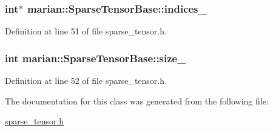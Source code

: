 \subsubsection[{\texorpdfstring{indices\+\_\+}{indices_}}]{\setlength{\rightskip}{0pt plus 5cm}int$\ast$ marian\+::\+Sparse\+Tensor\+Base\+::indices\+\_\+\hspace{0.3cm}{\ttfamily [private]}}\hypertarget{classmarian_1_1SparseTensorBase_a365dfd224d685b1cc9c8006d5f608cbf}{}\label{classmarian_1_1SparseTensorBase_a365dfd224d685b1cc9c8006d5f608cbf}


Definition at line 51 of file sparse\+\_\+tensor.\+h.

\subsubsection[{\texorpdfstring{size\+\_\+}{size_}}]{\setlength{\rightskip}{0pt plus 5cm}int marian\+::\+Sparse\+Tensor\+Base\+::size\+\_\+\hspace{0.3cm}{\ttfamily [private]}}\hypertarget{classmarian_1_1SparseTensorBase_a688fe45dc53bafb2eaded0ea9303867c}{}\label{classmarian_1_1SparseTensorBase_a688fe45dc53bafb2eaded0ea9303867c}


Definition at line 52 of file sparse\+\_\+tensor.\+h.



The documentation for this class was generated from the following file\+:\begin{DoxyCompactItemize}
\item 
\hyperlink{sparse__tensor_8h}{sparse\+\_\+tensor.\+h}\end{DoxyCompactItemize}
